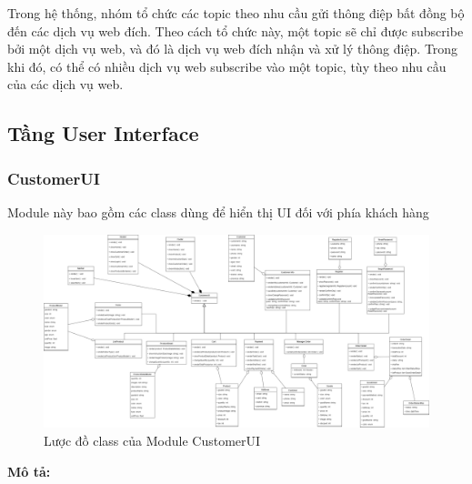 \par Trong hệ thống, nhóm tổ chức các topic theo nhu cầu gửi thông điệp bất đồng bộ đến các dịch vụ web đích. Theo cách tổ chức này, một topic sẽ chỉ được subscribe bởi một dịch vụ web, và đó là dịch vụ web đích nhận và xử lý thông điệp. Trong khi đó, có thể có nhiều dịch vụ web subscribe vào một topic, tùy theo nhu cầu của các dịch vụ web.

\subsection{Tầng User Interface}
\subsubsection{CustomerUI}
Module này bao gồm các class dùng để hiển thị UI đối với phía khách hàng
\begin{figure}[!htp]
	\centering
	\includegraphics[width=17cm]{img/Architecture/UI/customer UI.png}
	\newline
	\caption{Lược đồ class của Module CustomerUI}
\end{figure}
\textbf{Mô tả:}
